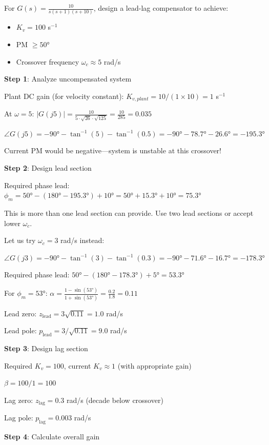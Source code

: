 \begin{example}
\label{ex:lead_lag_design}
For $G(s) = \frac{10}{s(s+1)(s+10)}$, design a lead-lag compensator to achieve:
\begin{itemize}
    \item $K_v = 100$ s$^{-1}$
    \item PM $\geq 50°$
    \item Crossover frequency $\omega_c \approx 5$ rad/s
\end{itemize}

\textbf{Step 1}: Analyze uncompensated system

Plant DC gain (for velocity constant): $K_{v,plant} = 10/(1 \times 10) = 1$ s$^{-1}$

At $\omega = 5$: $|G(j5)| = \frac{10}{5 \cdot \sqrt{26} \cdot \sqrt{125}} = \frac{10}{285} = 0.035$

$\angle G(j5) = -90° - \tan^{-1}(5) - \tan^{-1}(0.5) = -90° - 78.7° - 26.6° = -195.3°$

Current PM would be negative---system is unstable at this crossover!

\textbf{Step 2}: Design lead section

Required phase lead: $\phi_m = 50° - (180° - 195.3°) + 10° = 50° + 15.3° + 10° = 75.3°$

This is more than one lead section can provide. Use two lead sections or accept lower $\omega_c$.

Let us try $\omega_c = 3$ rad/s instead:

$\angle G(j3) = -90° - \tan^{-1}(3) - \tan^{-1}(0.3) = -90° - 71.6° - 16.7° = -178.3°$

Required phase lead: $50° - (180° - 178.3°) + 5° = 53.3°$

For $\phi_m = 53°$: $\alpha = \frac{1 - \sin(53°)}{1 + \sin(53°)} = \frac{0.2}{1.8} = 0.11$

Lead zero: $z_{\text{lead}} = 3\sqrt{0.11} = 1.0$ rad/s

Lead pole: $p_{\text{lead}} = 3/\sqrt{0.11} = 9.0$ rad/s

\textbf{Step 3}: Design lag section

Required $K_v = 100$, current $K_v \approx 1$ (with appropriate gain)

$\beta = 100/1 = 100$

Lag zero: $z_{\text{lag}} = 0.3$ rad/s (decade below crossover)

Lag pole: $p_{\text{lag}} = 0.003$ rad/s

\textbf{Step 4}: Calculate overall gain


\end{example}
